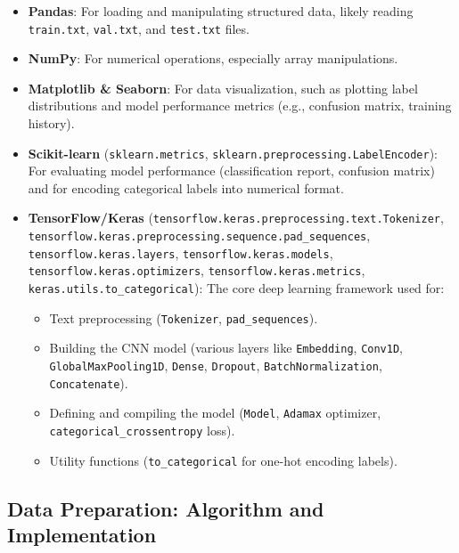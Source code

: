 \documentclass[twocolumn]{article}
\begin{document}
\begin{itemize}
    \item \textbf{Pandas}: For loading and manipulating structured data, likely reading \texttt{train.txt}, \texttt{val.txt}, and \texttt{test.txt} files.
    
    \item \textbf{NumPy}: For numerical operations, especially array manipulations.
    
    \item \textbf{Matplotlib \& Seaborn}: For data visualization, such as plotting label distributions and model performance metrics (e.g., confusion matrix, training history).
    
    \item \textbf{Scikit-learn} (\texttt{sklearn.metrics}, \texttt{sklearn.preprocessing.LabelEncoder}): For evaluating model performance (classification report, confusion matrix) and for encoding categorical labels into numerical format.
    
    \item \textbf{TensorFlow/Keras} (\texttt{tensorflow.keras.preprocessing.text.Tokenizer}, \texttt{tensorflow.keras.preprocessing.sequence.pad\_sequences}, \texttt{tensorflow.keras.layers}, \texttt{tensorflow.keras.models}, \texttt{tensorflow.keras.optimizers}, \texttt{tensorflow.keras.metrics}, \texttt{keras.utils.to\_categorical}): The core deep learning framework used for:
    \begin{itemize}
        \item Text preprocessing (\texttt{Tokenizer}, \texttt{pad\_sequences}).
        \item Building the CNN model (various layers like \texttt{Embedding}, \texttt{Conv1D}, \texttt{GlobalMaxPooling1D}, \texttt{Dense}, \texttt{Dropout}, \texttt{BatchNormalization}, \texttt{Concatenate}).
        \item Defining and compiling the model (\texttt{Model}, \texttt{Adamax} optimizer, \texttt{categorical\_crossentropy} loss).
        \item Utility functions (\texttt{to\_categorical} for one-hot encoding labels).
    \end{itemize}
\end{itemize}

\subsection{Data Preparation: Algorithm and Implementation}
\end{document}
